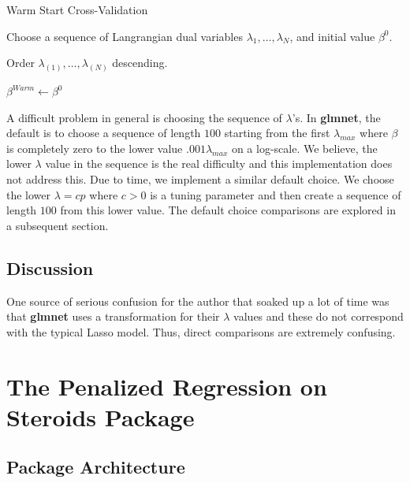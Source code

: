 \documentclass[article]{jss}
\numberwithin{equation}{section}
\begin{document}
\vspace{.2cm}
\begin{algorithm}[H]
\caption{Warm Start Cross-Validation}
Choose a sequence of Langrangian dual variables $\lambda_1, \ldots, \lambda_N$, and initial value $\beta^0$.

Order $\lambda_{(1)}, \ldots, \lambda_{(N)}$ descending.

$\beta^{Warm} \gets \beta^0$ 


\end{algorithm}
\vspace{.2cm}

A difficult problem in general is choosing the sequence of $\lambda$'s.
In \textbf{glmnet}, the default is to choose a sequence of length $100$ starting from the first $\lambda_{max}$ where $\beta$ is completely zero to the lower value $.001 \lambda_{max}$ on a log-scale.
We believe, the lower $\lambda$ value in the sequence is the real difficulty and this implementation does not address this.
Due to time, we implement a similar default choice.
We choose the lower $\lambda = c p$ where $c > 0$ is a tuning parameter and then create a sequence of length $100$ from this lower value.
The default choice comparisons are explored in a subsequent section.


\subsection{Discussion}

One source of serious confusion for the author that soaked up a lot of time was that \textbf{glmnet} uses a transformation for their $\lambda$ values and these do not correspond with the typical Lasso model. Thus, direct comparisons are extremely confusing.


\section{The Penalized Regression on Steroids Package}

\subsection{Package Architecture}
\end{document}
